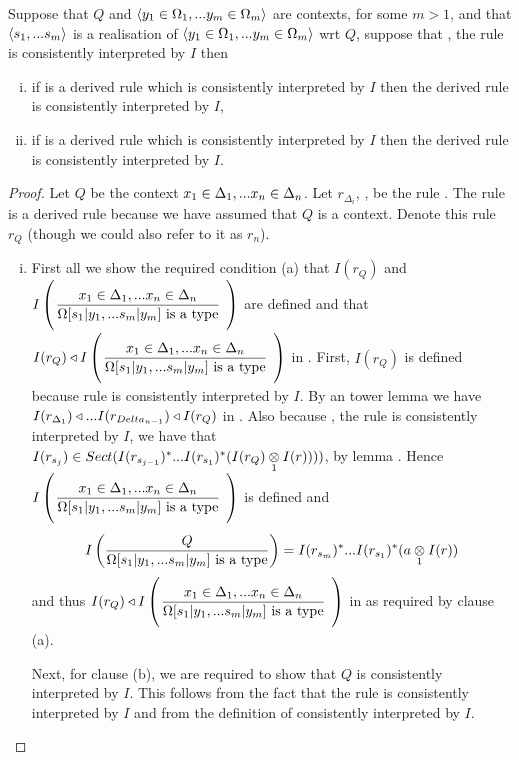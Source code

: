 \begin{lemma}
Suppose that $Q$ and $\encyOmega{m}$ are contexts, for some $m >1$, and that $\tuple{\sm}$ is a realisation of $\encyOmega{m}$ wrt $Q$,
suppose that \foreachj, the rule
 is consistently interpreted by $I$ then
\begin{enumerate}[(i)]
\item if \ZOmega is a derived rule which is consistently interpreted by $I$
then the derived rule 
\ZOmegaSUBsmFORym is consistently interpreted by $I$,
\item if \ZsOmega is a derived rule which is consistently interpreted by $I$
then the derived rule 
\ZsOmegaSUBsmFORym is consistently interpreted by $I$.
\end{enumerate}
\end{lemma}
\begin{proof}
Let $Q$ be the context $\xDelta{n}$. Let $r_{\Delta_i}$, \foreachi, be the rule .
\newcommand{\targetruleone}{\gatdisplayrule{\xDelta{n}}{\isT{\Omega[\SUBsFORy{m}]}}}
\newcommand{\Qtargetruleone}{\gatdisplayrule{\xDelta{n}}{\isT{\Omega[\SUBsFORy{m}]}}}
The rule  is a derived rule because we have assumed that $Q$ is a context. Denote this rule $r_Q$ (though we could also refer to it as $r_n$).
\begin{enumerate}[(i)]
\item
First all we show the required condition (a) that $I(r_Q)$ 
and $\Imap{\Qtargetruleone}$ are defined and that 
$I(r_Q) \base \Imap{\Qtargetruleone}$ in \catc. 
First, $I(r_Q)$ is defined because rule  is consistently interpreted by $I$. 
By an  tower lemma we have 
$I(r_{\Delta_1}) \base ... I(r_{Delta_{n-1}}) \base I(r_Q)$ in \catc.
Also because \foreachj, the rule  is consistently interpreted by $I$, 
we have that $I(r_{s_j}) \in Sect(I(r_{s_{j-1}})^*...I(r_{s_1})^*(\crossx{I(r_Q)}{I(r)}{1})))$, by lemma . Hence $\Imap{\Qtargetruleone}$ is defined and 
\begin{equation}
\label{omegaSubsmapping}
\Imappedrule{Q}{\isT{\Omega[\SUBsFORy{m}]}} 
= I(r_{s_m})^*...I(r_{s_1})^*(\crossx{a}{I(r)}{1})
\end{equation}
and thus $I(r_Q) \base \Imap{\Qtargetruleone}$ in \catc as required by clause (a).

Next, for clause (b), we are required to show that $Q$ is consistently interpreted by $I$. 
This follows from the fact that 
the rule  is consistently interpreted by $I$ 
and from the definition of consistently interpreted by $I$.


\end{enumerate}
\end{proof}
